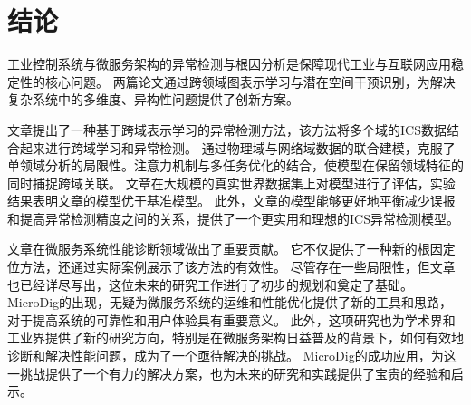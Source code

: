 \section{结论}

工业控制系统与微服务架构的异常检测与根因分析是保障现代工业与互联网应用稳定性的核心问题。
两篇论文通过跨领域图表示学习与潜在空间干预识别，为解决复杂系统中的多维度、异构性问题提供了创新方案。

文章\cite{zhan2024anomaly}提出了一种基于跨域表示学习的异常检测方法，该方法将多个域的ICS数据结合起来进行跨域学习和异常检测。
通过物理域与网络域数据的联合建模，克服了单领域分析的局限性。注意力机制与多任务优化的结合，使模型在保留领域特征的同时捕捉跨域关联。
文章在大规模的真实世界数据集上对模型进行了评估，实验结果表明文章的模型优于基准模型。
此外，文章的模型能够更好地平衡减少误报和提高异常检测精度之间的关系，提供了一个更实用和理想的ICS异常检测模型。

文章\cite{tao2024diagnosing}在微服务系统性能诊断领域做出了重要贡献。
它不仅提供了一种新的根因定位方法，还通过实际案例展示了该方法的有效性。
尽管存在一些局限性，但文章也已经详尽写出，这位未来的研究工作进行了初步的规划和奠定了基础。
MicroDig的出现，无疑为微服务系统的运维和性能优化提供了新的工具和思路，对于提高系统的可靠性和用户体验具有重要意义。
此外，这项研究也为学术界和工业界提供了新的研究方向，特别是在微服务架构日益普及的背景下，如何有效地诊断和解决性能问题，成为了一个亟待解决的挑战。
MicroDig的成功应用，为这一挑战提供了一个有力的解决方案，也为未来的研究和实践提供了宝贵的经验和启示。
